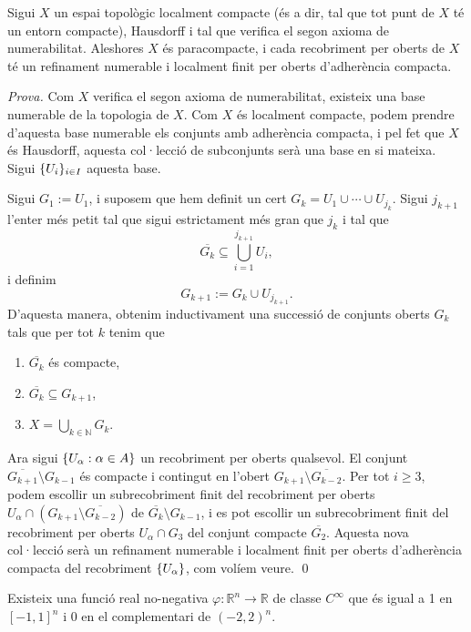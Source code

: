 \begin{lema}\label{lema:paracompact}
    Sigui $X$ un espai topològic localment compacte (és a dir, tal que tot punt de $X$ té un entorn compacte), Hausdorff i tal que verifica el segon axioma de numerabilitat. Aleshores $X$ és paracompacte, i cada recobriment per oberts de $X$ té un refinament numerable i localment finit per oberts d'adherència compacta.
\end{lema}
{\color{green!50!black} 
    \textit{Prova.} 
    Com $X$ verifica el segon axioma de numerabilitat, existeix una base numerable de la topologia de $X$. Com $X$ és localment compacte, podem prendre d'aquesta base numerable els conjunts amb adherència compacta, i pel fet que $X$ és Hausdorff, aquesta col·lecció de subconjunts serà una base en si mateixa. Sigui $\{U_i\}_{i\in I}$ aquesta base.

    Sigui $G_1 := U_1$, i suposem que hem definit un cert $G_k=U_1\cup\cdots\cup U_{j_k}$. Sigui $j_{k+1}$ l'enter més petit tal que sigui estrictament més gran que $j_k$ i tal que 
    \begin{equation*}
        \overline{G_k}\subseteq \bigcup_{i = 1}^{j_{k+1}} U_i,
    \end{equation*}
    i definim 
    \begin{equation*}
        G_{k+1} := G_k\cup U_{j_{k+1}}.
    \end{equation*}
    D'aquesta manera, obtenim inductivament una successió de conjunts oberts $G_k$ tals que per tot $k$ tenim que
    \begin{enumerate}
        \item $\overline{G_k}$ és compacte,
        \item $\overline{G_k}\subseteq G_{k+1}$,
        \item $X = \bigcup_{k\in\mathbb N} G_k$.
    \end{enumerate}
    Ara sigui $\{U_\alpha:\alpha\in A\}$ un recobriment per oberts qualsevol. El conjunt $\overline{G_{k+1}}\setminus G_{k-1}$ és compacte i contingut en l'obert $G_{k+1}\setminus \overline{G_{k-2}}$. Per tot $i\ge3$, podem escollir un subrecobriment finit del recobriment per oberts $U_\alpha\cap(G_{k+1}\setminus \overline{G_{k-2}})$ de $\overline{G_k}\setminus G_{k-1}$, i es pot escollir un subrecobriment finit del recobriment per oberts $U_\alpha\cap G_3$ del conjunt compacte $\overline{G_2}$. Aquesta nova col·lecció serà un refinament numerable i localment finit per oberts d'adherència compacta del recobriment $\{U_\alpha\}$, com volíem veure. \qed
}
\begin{lema}\label{lema:bump}
    Existeix una funció real no-negativa $\varphi:\mathbb R^n\to\mathbb R$ de classe $C^\infty$ que és igual a 1 en $[-1,1]^n$ i $0$ en el complementari de $(-2,2)^n$.
\end{lema}

